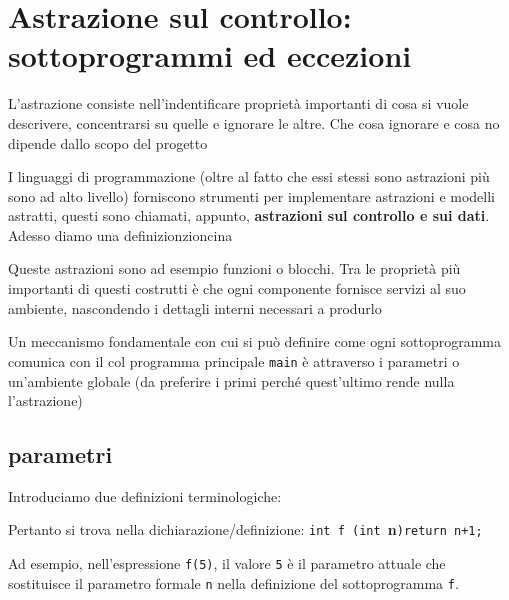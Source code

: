 \chapter{Astrazione sul controllo: sottoprogrammi ed eccezioni}

L'astrazione consiste nell'indentificare proprietà importanti di cosa si vuole descrivere, concentrarsi su quelle e ignorare le altre. Che cosa ignorare e cosa no dipende dallo scopo del progetto

I linguaggi di programmazione (oltre al fatto che essi stessi sono astrazioni più sono ad alto livello) forniscono strumenti per implementare astrazioni e modelli astratti, questi sono chiamati, appunto, \textbf{astrazioni sul controllo e sui dati}. Adesso diamo una definizionzioncina


Queste astrazioni sono ad esempio funzioni o blocchi. Tra le proprietà più importanti di questi costrutti è che ogni componente fornisce servizi al suo ambiente, nascondendo i dettagli interni necessari a produrlo

Un meccanismo fondamentale con cui si può definire come ogni sottoprogramma comunica con il col programma principale \texttt{main} è attraverso i parametri o un'ambiente globale (da preferire i primi perché quest'ultimo rende nulla l'astrazione)

\section{parametri}

Introduciamo due definizioni terminologiche:

Pertanto si trova nella dichiarazione/definizione: \texttt{int f (int }\textbf{n}\texttt{){return n+1;}}


Ad esempio, nell'espressione \texttt{f(5)}, il valore \texttt{5} è il parametro attuale che sostituisce il parametro formale \texttt{n} nella definizione del sottoprogramma \texttt{f}.

